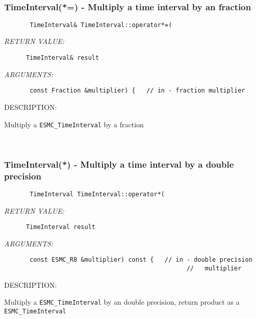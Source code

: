\mbox{}\hrulefill\ 
 
\subsubsection [TimeInterval(*=)] {TimeInterval(*=) - Multiply a time interval by an fraction}


  
\begin{verbatim}       TimeInterval& TimeInterval::operator*=(\end{verbatim}{\em RETURN VALUE:}
\begin{verbatim}      TimeInterval& result\end{verbatim}{\em ARGUMENTS:}
\begin{verbatim}       const Fraction &multiplier) {   // in - fraction multiplier\end{verbatim}
{\sf DESCRIPTION:\\ }


       Multiply a {\tt ESMC\_TimeInterval} by a fraction
   
 
\mbox{}\hrulefill\ 
 
\subsubsection [TimeInterval(*)] {TimeInterval(*) - Multiply a time interval by a double precision}


  
\begin{verbatim}       TimeInterval TimeInterval::operator*(\end{verbatim}{\em RETURN VALUE:}
\begin{verbatim}      TimeInterval result\end{verbatim}{\em ARGUMENTS:}
\begin{verbatim}       const ESMC_R8 &multiplier) const {   // in - double precision
                                                  //   multiplier\end{verbatim}
{\sf DESCRIPTION:\\ }


       Multiply a {\tt ESMC\_TimeInterval} by an double precision,
       return product as a {\tt ESMC\_TimeInterval}
   
 
